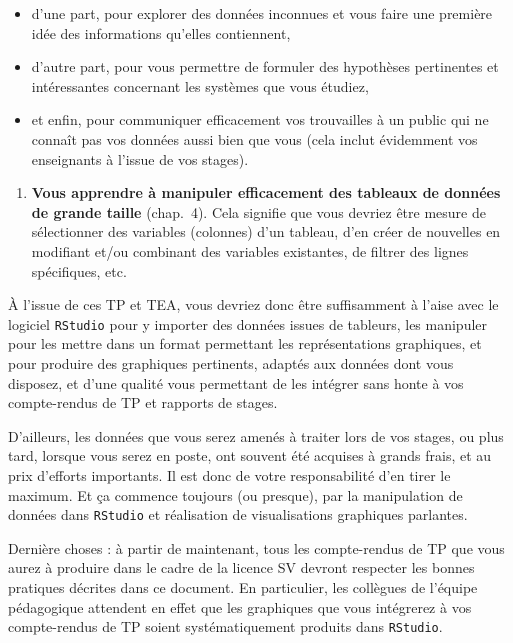 \documentclass[
  letterpaper,
  DIV=11,
  numbers=noendperiod]{scrreprt}
\providecommand{\tightlist}{%
  \setlength{\itemsep}{0pt}\setlength{\parskip}{0pt}}\usepackage{longtable,booktabs,array}
\begin{document}
\begin{itemize}
\tightlist
\item
  d'une part, pour explorer des données inconnues et vous faire une
  première idée des informations qu'elles contiennent,
\item
  d'autre part, pour vous permettre de formuler des hypothèses
  pertinentes et intéressantes concernant les systèmes que vous étudiez,
\item
  et enfin, pour communiquer efficacement vos trouvailles à un public
  qui ne connaît pas vos données aussi bien que vous (cela inclut
  évidemment vos enseignants à l'issue de vos stages).
\end{itemize}

\begin{enumerate}
\def\labelenumi{\arabic{enumi}.}
\setcounter{enumi}{2}
\tightlist
\item
  \textbf{Vous apprendre à manipuler efficacement des tableaux de
  données de grande taille} (chap.~4). Cela signifie que vous devriez
  être mesure de sélectionner des variables (colonnes) d'un tableau,
  d'en créer de nouvelles en modifiant et/ou combinant des variables
  existantes, de filtrer des lignes spécifiques, etc.
\end{enumerate}

À l'issue de ces TP et TEA, vous devriez donc être suffisamment à l'aise
avec le logiciel \texttt{RStudio} pour y importer des données issues de
tableurs, les manipuler pour les mettre dans un format permettant les
représentations graphiques, et pour produire des graphiques pertinents,
adaptés aux données dont vous disposez, et d'une qualité vous permettant
de les intégrer sans honte à vos compte-rendus de TP et rapports de
stages.

D'ailleurs, les données que vous serez amenés à traiter lors de vos
stages, ou plus tard, lorsque vous serez en poste, ont souvent été
acquises à grands frais, et au prix d'efforts importants. Il est donc de
votre responsabilité d'en tirer le maximum. Et ça commence toujours (ou
presque), par la manipulation de données dans \texttt{RStudio} et
réalisation de visualisations graphiques parlantes.

Dernière choses : à partir de maintenant, tous les compte-rendus de TP
que vous aurez à produire dans le cadre de la licence SV devront
respecter les bonnes pratiques décrites dans ce document. En
particulier, les collègues de l'équipe pédagogique attendent en effet
que les graphiques que vous intégrerez à vos compte-rendus de TP soient
systématiquement produits dans \texttt{RStudio}.
\end{document}
